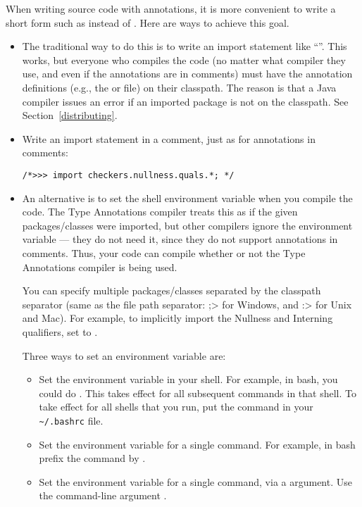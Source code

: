 When writing source code with annotations, it is more convenient to write a
short form such as  instead of
.  Here are ways to achieve this goal.

\label{jsr308_imports}

\begin{itemize}
\item
The traditional way to do this is to write an import statement like
``''.  This works, but everyone who
compiles the code (no matter what compiler they use, and even if the
annotations are in comments) must have the annotation definitions (e.g.,
the  or  file) on their
classpath.  The reason is that a Java compiler issues an error if an
imported package is not on the classpath.  See Section~\ref{distributing}.

\item
Write an import statement in a comment, just as for annotations in comments:
\begin{Verbatim}
/*>>> import checkers.nullness.quals.*; */
\end{Verbatim}

\item
An alternative is to set the shell environment variable
 when you compile the code.
The Type Annotations compiler treats this as if the given packages/classes were
imported, but other compilers
ignore the
 environment variable --- they do not need it, since
they do not support annotations in comments.  Thus, your code can compile
whether or not the Type Annotations compiler is being used.

You can specify multiple packages/classes separated by the classpath separator
(same as the file path separator:  \<;> for Windows, and \<:> for Unix and
Mac).  For example, to implicitly import the Nullness and Interning
qualifiers, set  to
.

Three ways to set an environment variable are:
\begin{itemize}
\item
  Set the environment variable in your shell.  For example, in bash, you
  could do .
  This takes effect for all subsequent commands in that shell.  To take
  effect for all shells that you run, put the command in your
  \verb|~/.bashrc| file.
\item
  Set the environment variable for a single command.  For example, in bash
  prefix the  command by
  .
\item
  Set the environment variable for a single command, via a 
  argument.  Use the  command-line argument
  .
\end{itemize}


\end{itemize}
